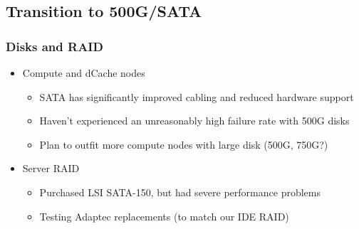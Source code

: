 \documentclass{beamer}
\begin{document}
\subsection{Transition to 500G/SATA}
\begin{frame}
\frametitle{Disks and RAID}
\begin{itemize}
    \item Compute and dCache nodes
    \begin{itemize}
        \item SATA has significantly improved cabling and reduced hardware 
        support
        \item Haven't experienced an unreasonably high failure rate with 500G disks
        \item Plan to outfit more compute nodes with large disk (500G, 750G?)
    \end{itemize}
    \item Server RAID
    \begin{itemize}
        \item Purchased LSI SATA-150, but had severe performance problems
        \item Testing Adaptec replacements (to match our IDE RAID)
    \end{itemize}
\end{itemize}
\end{frame}
\end{document}
